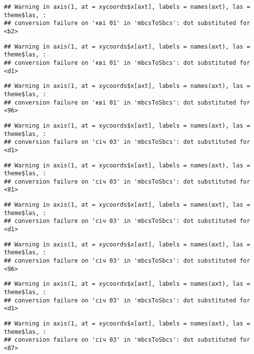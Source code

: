 \documentclass[]{article}
\begin{document}
\begin{verbatim}
## Warning in axis(1, at = xycoords$x[axt], labels = names(axt), las = theme$las, :
## conversion failure on 'кві 01' in 'mbcsToSbcs': dot substituted for <b2>
\end{verbatim}

\begin{verbatim}
## Warning in axis(1, at = xycoords$x[axt], labels = names(axt), las = theme$las, :
## conversion failure on 'кві 01' in 'mbcsToSbcs': dot substituted for <d1>
\end{verbatim}

\begin{verbatim}
## Warning in axis(1, at = xycoords$x[axt], labels = names(axt), las = theme$las, :
## conversion failure on 'кві 01' in 'mbcsToSbcs': dot substituted for <96>
\end{verbatim}

\begin{verbatim}
## Warning in axis(1, at = xycoords$x[axt], labels = names(axt), las = theme$las, :
## conversion failure on 'січ 03' in 'mbcsToSbcs': dot substituted for <d1>
\end{verbatim}

\begin{verbatim}
## Warning in axis(1, at = xycoords$x[axt], labels = names(axt), las = theme$las, :
## conversion failure on 'січ 03' in 'mbcsToSbcs': dot substituted for <81>
\end{verbatim}

\begin{verbatim}
## Warning in axis(1, at = xycoords$x[axt], labels = names(axt), las = theme$las, :
## conversion failure on 'січ 03' in 'mbcsToSbcs': dot substituted for <d1>
\end{verbatim}

\begin{verbatim}
## Warning in axis(1, at = xycoords$x[axt], labels = names(axt), las = theme$las, :
## conversion failure on 'січ 03' in 'mbcsToSbcs': dot substituted for <96>
\end{verbatim}

\begin{verbatim}
## Warning in axis(1, at = xycoords$x[axt], labels = names(axt), las = theme$las, :
## conversion failure on 'січ 03' in 'mbcsToSbcs': dot substituted for <d1>
\end{verbatim}

\begin{verbatim}
## Warning in axis(1, at = xycoords$x[axt], labels = names(axt), las = theme$las, :
## conversion failure on 'січ 03' in 'mbcsToSbcs': dot substituted for <87>
\end{verbatim}
\end{document}
